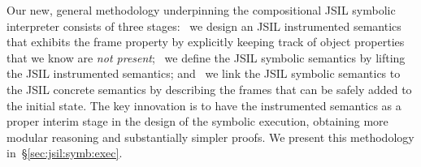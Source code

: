 \documentclass[sigconf, review]{acmart}
\newcommand{\jsil}{JSIL\xspace}
\newcommand{\JSComp}{JS-2-JSIL\xspace}
\newcommand{\cosette}{Cosette\xspace}
\newcommand{\pmaxinline}[1]{ {\color{blue} *** PM : #1 ***} }
\newif\ifComments
\newcommand{\pmax}[1]{%
\ifComments
\begin{center}
\fbox{\begin{minipage}{0.4\textwidth} \color{blue}
{\rm PM: \small #1}
\end{minipage}}
\end{center}
\fi}
\begin{document}
                  
            
Our new, general methodology underpinning the compositional JSIL symbolic
interpreter consists of three stages: ~we design an JSIL
instrumented semantics that exhibits the frame property by explicitly
keeping track of object properties that we know are {\em not present}; 
~we define
the JSIL symbolic semantics by lifting the JSIL instrumented
semantics; and ~we link the JSIL symbolic semantics to the
JSIL concrete  semantics by describing the frames that can be safely
added to the initial state.
%
The key innovation is to have the instrumented semantics as a proper
interim stage in the design of the symbolic execution, obtaining more modular
reasoning and substantially simpler proofs. We present this methodology  in~\S\ref{sec:jsil:symb:exec}. 













%
\end{document}
